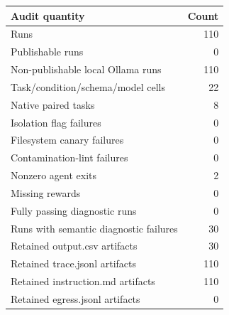 \begin{tabular}{lr}
\toprule
Audit quantity & Count \\
\midrule
Runs & 110 \\
Publishable runs & 0 \\
Non-publishable local Ollama runs & 110 \\
Task/condition/schema/model cells & 22 \\
Native paired tasks & 8 \\
Isolation flag failures & 0 \\
Filesystem canary failures & 0 \\
Contamination-lint failures & 0 \\
Nonzero agent exits & 2 \\
Missing rewards & 0 \\
Fully passing diagnostic runs & 0 \\
Runs with semantic diagnostic failures & 30 \\
Retained output.csv artifacts & 30 \\
Retained trace.jsonl artifacts & 110 \\
Retained instruction.md artifacts & 110 \\
Retained egress.jsonl artifacts & 0 \\
\bottomrule
\end{tabular}
